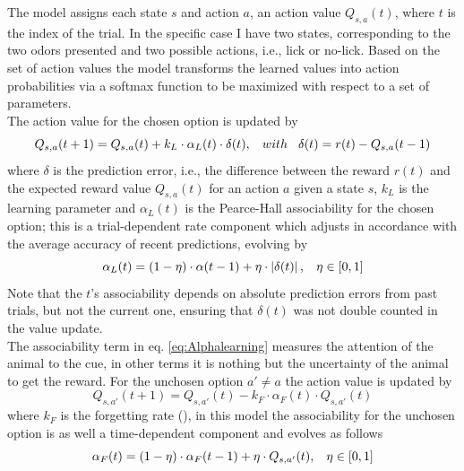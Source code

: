 The model assigns each state $s$ and action $a$, an action value $Q_{s,a}(t)$, where $t$ is the index of the trial. In the specific case I have two states, corresponding to the two odors presented and two possible actions, i.e., lick or no-lick. 
Based on the set of action values the model transforms the learned values into action probabilities via a softmax function to be maximized with respect to a set of parameters.\\The action value for the chosen option is updated by
\begin{equation}
Q_{s,a}(t+1)  = Q_{s,a}(t)+k_L\cdot\alpha_L(t)\cdot\delta(t), \hspace{0.3cm} with \hspace{0.3cm}\delta(t)=r(t)-Q_{s,a}(t-1)
\label{eq:Qlearning}
\end{equation}
where $\delta$ is the prediction error, i.e., the difference between the reward $r(t)$ and the expected reward value $Q_{s,a}(t)$ for an action $a$ given a state $s$, $k_L$ is the learning parameter and $\alpha_L(t)$ is the Pearce-Hall associability for the chosen option; this is a trial-dependent rate component which adjusts in accordance with the average accuracy of recent predictions, evolving by
\begin{equation}
   \alpha_L(t)=(1-\eta)\cdot\alpha(t-1)+\eta\cdot\left\lvert\delta(t)\right\rvert,\hspace{0.3cm} \eta\in[0,1]
    \label{eq:Alphalearning}
\end{equation}
Note that the $t$'s associability depends on absolute prediction errors from past trials, but not the current one, ensuring that $\delta(t)$ was not double counted in the value update.\\The associability term in eq. \ref{eq:Alphalearning} measures the attention of the animal to the cue, in other terms it is nothing but the uncertainty of the animal to get the reward. 
For the unchosen option $a'\neq a$ the action value is updated by
\begin{equation}
    Q_{s,a'}(t+1) = Q_{s,a'}(t)-k_F\cdot\alpha_F(t)\cdot Q_{s,a'}(t)
    \label{eq:Qforgetting}
\end{equation}
where $k_F$ is the forgetting rate (\cite{ItoDoya1}), in this model the associability for the unchosen option is as well a time-dependent component and evolves as follows
\begin{equation}
    \alpha_F(t)=(1-\eta)\cdot\alpha_F(t-1)+\eta\cdot Q_{s,a'}(t), \hspace{0.3cm}
    \eta\in[0,1]
    \label{eq:Alphaforgetting}
\end{equation}
